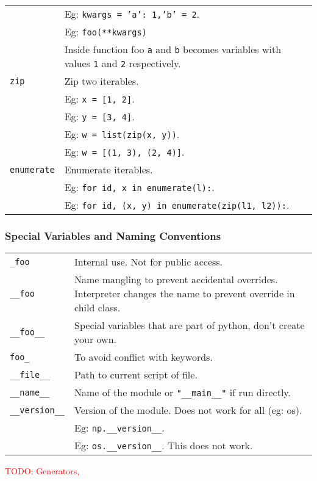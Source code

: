 \begin{tabularx}{\linewidth}{lX}
                                    & Eg: \texttt{kwargs = {'a': 1,'b' = 2}}.\\
                                    & Eg: \texttt{foo(**kwargs)}\\
                                    & Inside function foo \texttt{a} and \texttt{b} becomes variables with
                                      values \texttt{1} and \texttt{2} respectively.\\
    \hline
    \texttt{zip}                    & Zip two iterables.\\
                                    & Eg: \texttt{x = [1, 2]}.\\
                                    & Eg: \texttt{y = [3, 4]}.\\
                                    & Eg: \texttt{w = list(zip(x, y))}.\\
                                    & Eg: \texttt{w = [(1, 3), (2, 4)]}.\\
    \texttt{enumerate}              & Enumerate iterables.\\ 
                                    & Eg: \texttt{for id, x in enumerate(l):}.\\
                                    & Eg: \texttt{for id, (x, y) in enumerate(zip(l1, l2)):}.\\
    \hline

\end{tabularx}

\subsubsection{Special Variables and Naming Conventions}

\begin{tabularx}{\linewidth}{lX}
\texttt{\_foo}                  & Internal use. Not for public access.\\
\texttt{\_\_foo}                & Name mangling to prevent accidental overrides. Interpreter changes
                                    the name to prevent override in child class.\\
\texttt{\_\_foo\_\_}            & Special variables that are part of python, don't create your own.\\
\texttt{foo\_}                  & To avoid conflict with keywords.\\
\hline
\texttt{\_\_file\_\_}           & Path to current script of file.\\
\texttt{\_\_name\_\_}           & Name of the module or \texttt{"\_\_main\_\_"} if run directly.\\
\texttt{\_\_version\_\_}        & Version of the module. Does not work for all (eg: os).\\
                                & Eg: \texttt{np.\_\_version\_\_}.\\
                                & Eg: \texttt{os.\_\_version\_\_}. This does not work.\\
\hline
\end{tabularx}



\textcolor{red}{TODO: Generators, }

\columnbreak